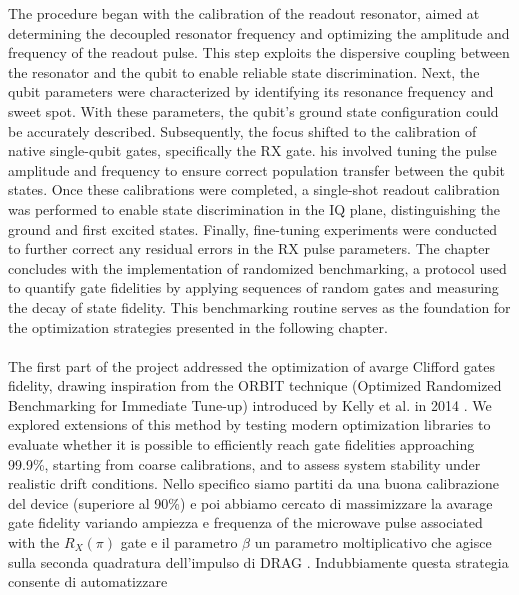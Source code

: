 The procedure began with the calibration of the readout resonator, aimed at determining the decoupled resonator frequency and optimizing the amplitude and frequency of the readout pulse. 
This step exploits the dispersive coupling between the resonator and the qubit to enable reliable state discrimination.
Next, the qubit parameters were characterized by identifying its resonance frequency and sweet spot. 
With these parameters, the qubit's ground state configuration could be accurately described.
Subsequently, the focus shifted to the calibration of native single-qubit gates, specifically the RX gate. 
his involved tuning the pulse amplitude and frequency to ensure correct population transfer between the qubit states.
Once these calibrations were completed, a single-shot readout calibration was performed to enable state discrimination in the IQ plane, distinguishing the ground and first excited states.
Finally, fine-tuning experiments were conducted to further correct any residual errors in the RX pulse parameters. 
The chapter concludes with the implementation of randomized benchmarking, a protocol used to quantify gate fidelities by applying sequences of random gates and measuring the decay of state fidelity. This benchmarking routine serves as the foundation for the optimization strategies presented in the following chapter.


\paragraph{}
The first part of the project addressed the optimization of avarge Clifford gates fidelity, drawing inspiration from the ORBIT technique (Optimized Randomized Benchmarking for Immediate Tune-up) introduced by Kelly et al. in 2014 \cite{kelly_optimal_2014}. 
We explored extensions of this method by testing modern optimization libraries to evaluate whether it is possible to efficiently reach gate fidelities approaching 99.9\%, starting from coarse calibrations, and to assess system stability under realistic drift conditions.
Nello specifico siamo partiti da una buona calibrazione del device (superiore al 90\%) e poi abbiamo cercato di massimizzare la avarage gate fidelity variando ampiezza e frequenza of the microwave pulse associated with the $R_X(\pi)$ gate e il parametro $\beta$ un parametro moltiplicativo che agisce sulla seconda quadratura dell'impulso di DRAG \cite{Motzoi_2009}.
Indubbiamente questa strategia consente di automatizzare    

